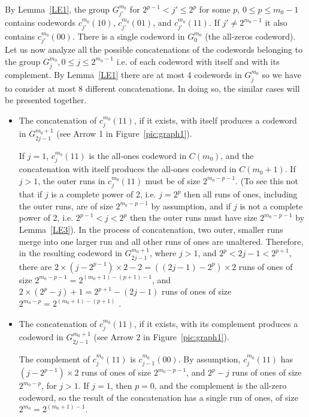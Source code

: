 By Lemma~\ref{LE1}, the group $G_{j'}^{m_0}$ for $2^{p-1}< j' \leq
2^{p}$ for some $p$, $0 \leq p \leq m_0-1$ contains codewords
$c_{j'}^{m_0}(10)$, $c_{j'}^{m_0}(01)$, and $c_{j'}^{m_0}(11)$. If
$j' \neq 2^{m_0-1}$ it also contains $c_{j'}^{m_0}(00)$. There is
a single codeword in $G_0^{m_0}$ (the all-zeros codeword). Let us
now analyze all the possible concatenations of the codewords
belonging to the group $G_j^{m_0}, 0 \leq j \leq 2^{m_0-1}$ i.e.
of each codeword with itself and with its complement. By
Lemma~\ref{LE1} there are at most 4 codewords in $G_j^{m_0}$ so we
have to consider at most 8 different concatenations. In doing so,
the similar cases will be presented together.
\begin{itemize}
\item The concatenation of $c_j^{m_0}(11)$, if it exists, with
itself produces a codeword in $G_{2j-1}^{m_0+1}$ (see Arrow 1 in
Figure~\ref{pic:graph1}).

If $j=1$, $c_j^{m_0}(11)$ is the all-ones codeword in $C(m_0)$,
and the concatenation with itself produces the all-ones codeword
in $C(m_0+1)$. If $j>1$, the outer runs in $c_j^{m_0}(11)$ must be
of size $2^{m_0-p-1}$. (To see this not that if $j$ is a complete
power of 2, i.e. $j=2^p$ then all runs of ones, including the
outer runs, are of size $2^{m_0-p-1}$ by assumption, and if $j$ is
not a complete power of 2, i.e. $2^{p-1} < j < 2^p$ then the outer
runs must have size $2^{m_0-p-1}$ by Lemma~\ref{LE3}). In the
process of concatenation, two outer, smaller runs merge into one
larger run and all other runs of ones are unaltered. Therefore, in
the resulting codeword in $G_{2j-1}^{m_0+1}$, where $j>1$, and
$2^p < 2j-1 < 2^{p+1}$, there are $2\times (j-2^{p-1})\times
2-2=((2j-1)-2^{p})\times 2$ runs of ones of size
$2^{m_0-p-1}=2^{(m_0+1)-(p+1)-1}$, and
$2\times(2^p-j)+1=2^{p+1}-(2j-1)$ runs of ones of size
$2^{m_0-p}=2^{(m_0+1)-(p+1)}$ .

\item The concatenation of $c_j^{m_0}(11)$, if it exists, with its
complement produces a codeword in $G_{2j-1}^{m_0+1}$ (see Arrow 2
in Figure~\ref{pic:graph1}).

The complement of $c_j^{m_0}(11)$ is $c_{j-1}^{m_0}(00)$. By
assumption, $c_j^{m_0}(11)$ has $(j-2^{p-1})\times 2$ runs of ones
of size $2^{m_0-p-1}$, and $2^p-j$ runs of ones of size
$2^{m_0-p}$, for $j>1$. If $j=1$, then $p=0$, and the complement
is the all-zero codeword, so the result of the concatenation has a
single run of ones, of size $2^{m_0}=2^{(m_0+1)-1}$.


\end{itemize}
